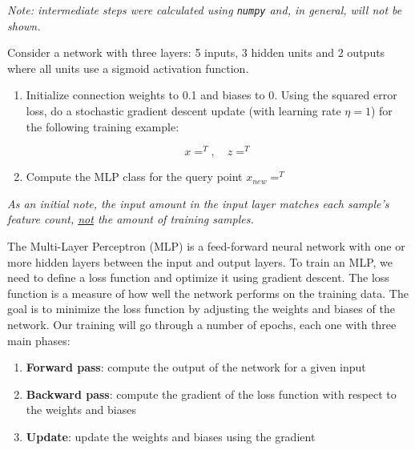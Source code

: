 \documentclass[12pt]{article}
\begin{document}
\textit{Note: intermediate steps were calculated using \texttt{numpy} and, in general, will not be shown.}

\begin{enumerate}[leftmargin=\labelsep]
  \begin{tcolorbox}[enhanced jigsaw,colback=bg,boxrule=0pt,arc=1pt,halign=center]
    \item Consider a network with three layers: 5 inputs, 3 hidden units and 2 outputs
    where all units use a sigmoid activation function.

    \begin{enumerate}
      \item {Initialize connection weights to 0.1 and biases to 0. Using the squared
            error loss, do a stochastic gradient descent update (with learning rate $\eta = 1$)
            for the following training example:

            \begin{equation*}
              x = ^T, \quad z = ^T
            \end{equation*}} \label{ex-1-a}

      \item {Compute the MLP class for the query point $x_{new} = ^T$} \label{ex-1-b}
    \end{enumerate}
  \end{tcolorbox}

  \textit{As an initial note, the \textit{input amount} in the input layer matches each sample's
    feature count, \underline{not} the amount of training samples.}

  The Multi-Layer Perceptron (MLP) is a feed-forward neural network with one or more hidden layers
  between the input and output layers. To train an MLP, we need to define a loss function and
  optimize it using gradient descent. The loss function is a measure of how well the network
  performs on the training data. The goal is to minimize the loss function by adjusting the
  weights and biases of the network. Our training will go through a number of epochs, each
  one with three main phases:

  \begin{enumerate}
    \item \textbf{Forward pass}: compute the output of the network for a given input
    \item \textbf{Backward pass}: compute the gradient of the loss function with respect to the
          weights and biases
    \item \textbf{Update}: update the weights and biases using the gradient
  \end{enumerate}


\end{enumerate}
\end{document}
